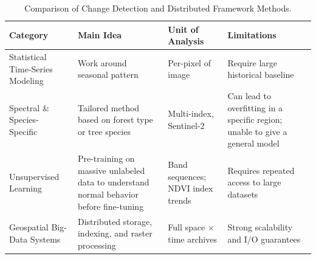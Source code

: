 \begin{table}[H]
\centering
\begin{tabular}{|p{3.2cm}|p{3.5cm}|p{3.2cm}|p{4cm}|}
\hline
\textbf{Category} & \textbf{Main Idea} & \textbf{Unit of Analysis} & \textbf{Limitations} \\
\hline

Statistical Time-Series Modeling~\cite{kennedy2010,xie2025} 
& Work around seasonal pattern 
& Per-pixel of image 
& Require large historical baseline \\
\hline

Spectral \& Species-Specific~\cite{carletti2025,jamali2024,konig2023} 
& Tailored method based on forest type or tree species 
& Multi-index, Sentinel-2 
& Can lead to overfitting in a specific region; unable to give a general model \\
\hline

Unsupervised Learning~\cite{jakubik2023,kirsch2025,gorelick2017,zhang_ssl2025} 
& Pre-training on massive unlabeled data to understand normal behavior before fine-tuning 
& Band sequences; NDVI index trends 
& Requires repeated access to large datasets \\
\hline

Geospatial Big-Data Systems~\cite{rdpro2024,yu2019} 
& Distributed storage, indexing, and raster processing 
& Full space $\times$ time archives 
& Strong scalability and I/O guarantees \\
\hline

\end{tabular}

\vspace{4pt}
\caption{Comparison of Change Detection and Distributed Framework Methods.}
\label{tab:comparison}
\end{table}

